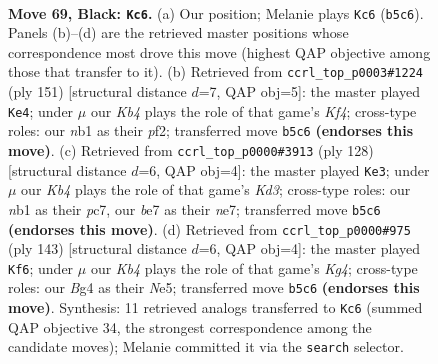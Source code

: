 \documentclass[11pt]{article}
\begin{document}
\clearpage

\begin{figure}[p]\centering
\begin{subfigure}{0.46\textwidth}\centering
\resizebox{\linewidth}{!}{%
\newchessgame
\chessboard[
  setfen={8/4B3/8/pk6/2p3b1/8/5K2/1N6 b - - 7 69},
  showmover=false,
  pgfstyle=straightmove, color=movearrow, markmove={b5-c6}
]}
\caption{}
\end{subfigure}\hfill
\begin{subfigure}{0.46\textwidth}\centering
\resizebox{\linewidth}{!}{%
\newchessgame
\chessboard[
  setfen={8/1K2B3/8/5k2/5pp1/8/5P2/8 b - - 0 76},
  showmover=false,
  pgfstyle=straightmove, color=movearrow, markmove={f5-e4}
]}
\caption{}
\end{subfigure}
\\[4pt]
\begin{subfigure}{0.46\textwidth}\centering
\resizebox{\linewidth}{!}{%
\newchessgame
\chessboard[
  setfen={8/2p1n3/4B3/6k1/3PP3/3K4/8/8 w - - 1 65},
  showmover=false,
  pgfstyle=straightmove, color=movearrow, markmove={d3-e3}
]}
\caption{}
\end{subfigure}\hfill
\begin{subfigure}{0.46\textwidth}\centering
\resizebox{\linewidth}{!}{%
\newchessgame
\chessboard[
  setfen={2B5/8/8/4n1kp/5p2/8/5K2/8 b - - 9 72},
  showmover=false,
  pgfstyle=straightmove, color=movearrow, markmove={g5-f6}
]}
\caption{}
\end{subfigure}
\caption{\textbf{Move 69, Black: \texttt{Kc6}.} (a) Our position; Melanie plays \texttt{Kc6} (\texttt{b5c6}). Panels (b)--(d) are the retrieved master positions whose correspondence most drove this move (highest QAP objective among those that transfer to it). (b) Retrieved from \texttt{ccrl\_top\_p0003\#1224} (ply 151) [structural distance $d$=7, QAP obj=5]: the master played \texttt{Ke4}; under $\mu$ our \emph{Kb4} plays the role of that game's \emph{Kf4}; cross-type roles: our \emph{n}b1 as their \emph{p}f2; transferred move \texttt{b5c6} \textbf{(endorses this move)}. (c) Retrieved from \texttt{ccrl\_top\_p0000\#3913} (ply 128) [structural distance $d$=6, QAP obj=4]: the master played \texttt{Ke3}; under $\mu$ our \emph{Kb4} plays the role of that game's \emph{Kd3}; cross-type roles: our \emph{n}b1 as their \emph{p}c7, our \emph{b}e7 as their \emph{n}e7; transferred move \texttt{b5c6} \textbf{(endorses this move)}. (d) Retrieved from \texttt{ccrl\_top\_p0000\#975} (ply 143) [structural distance $d$=6, QAP obj=4]: the master played \texttt{Kf6}; under $\mu$ our \emph{Kb4} plays the role of that game's \emph{Kg4}; cross-type roles: our \emph{B}g4 as their \emph{N}e5; transferred move \texttt{b5c6} \textbf{(endorses this move)}. Synthesis: 11 retrieved analogs transferred to \texttt{Kc6} (summed QAP objective 34, the strongest correspondence among the candidate moves); Melanie committed it via the \texttt{search} selector.}
\label{fig:thought-m137}
\end{figure}
\end{document}
